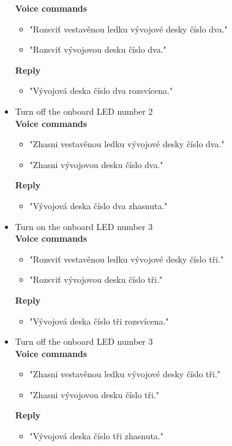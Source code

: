 \begin{itemize}
    \textbf{Voice commands}
    \begin{itemize}
        \item "Rozsviť vestavěnou ledku vývojové desky číslo dva."
        \item "Rozsviť vývojovou desku číslo dva."
    \end{itemize}
    \textbf{Reply}
    \begin{itemize}
        \item "Vývojová deska číslo dva rozsvícena."
    \end{itemize}
    \item Turn off the onboard LED number 2\\
    \textbf{Voice commands}
    \begin{itemize}
        \item "Zhasni vestavěnou ledku vývojové desky číslo dva."
        \item "Zhasni vývojovou desku číslo dva."
    \end{itemize}
    \textbf{Reply}
    \begin{itemize}
        \item "Vývojová deska číslo dva zhasnuta."
    \end{itemize}
    \item Turn on the onboard LED number 3\\
    \textbf{Voice commands}
    \begin{itemize}
        \item "Rozsviť vestavěnou ledku vývojové desky číslo tři."
        \item "Rozsviť vývojovou desku číslo tři."
    \end{itemize}
    \textbf{Reply}
    \begin{itemize}
        \item "Vývojová deska číslo tři rozsvícena."
    \end{itemize}
    \item Turn off the onboard LED number 3\\
    \textbf{Voice commands}
    \begin{itemize}
        \item "Zhasni vestavěnou ledku vývojové desky číslo tři."
        \item "Zhasni vývojovou desku číslo tři."
    \end{itemize}
    \textbf{Reply}
    \begin{itemize}
        \item "Vývojová deska číslo tři zhasnuta."

\end{itemize}
\end{itemize}
